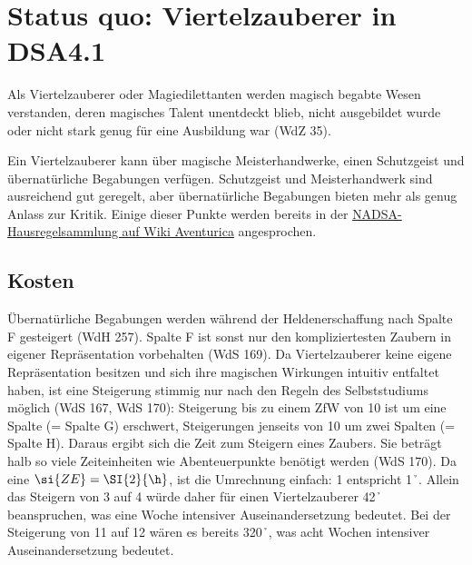 \section{Status quo: Viertelzauberer in DSA4.1}
Als Viertelzauberer oder Magiedilettanten werden magisch begabte Wesen verstanden, deren magisches Talent unentdeckt blieb, nicht ausgebildet wurde oder nicht stark genug für eine Ausbildung war (WdZ 35).

Ein Viertelzauberer kann über magische Meisterhandwerke, einen Schutzgeist und übernatürliche Begabungen verfügen. Schutzgeist und Meisterhandwerk sind ausreichend gut geregelt, aber übernatürliche Begabungen bieten mehr als genug Anlass zur Kritik. Einige dieser Punkte werden bereits in der \href{https://www.wiki-aventurica.de/wiki/Hausregelsammlung/NADSA/Viertelzauberer}{NADSA-Hausregelsammlung auf Wiki Aventurica} angesprochen.

\subsection{Kosten}
Übernatürliche Begabungen werden während der Heldenerschaffung nach Spalte F gesteigert (WdH 257). Spalte F ist sonst nur den kompliziertesten Zaubern in eigener Repräsentation vorbehalten (WdS 169). Da Viertelzauberer keine eigene Repräsentation besitzen und sich ihre magischen Wirkungen intuitiv entfaltet haben, ist eine Steigerung stimmig nur nach den Regeln des Selbststudiums möglich (WdS 167, WdS 170): Steigerung bis zu einem ZfW von 10 ist um eine Spalte (= Spalte G) erschwert, Steigerungen jenseits von 10 um zwei Spalten (= Spalte H). Daraus ergibt sich die Zeit zum Steigern eines Zaubers. Sie beträgt halb so viele Zeiteinheiten wie Abenteuerpunkte benötigt werden (WdS 170). Da eine $\si{ZE} = \SI{2}{\h}$, ist die Umrechnung einfach: \SI{1}{\AP} entspricht \SI{1}{\h}. Allein das Steigern von 3 auf 4 würde daher für einen Viertelzauberer \SI{42}{\h} beanspruchen, was eine Woche intensiver Auseinandersetzung bedeutet. Bei der Steigerung von 11 auf 12 wären es bereits \SI{320}{\h}, was acht Wochen intensiver Auseinandersetzung bedeutet.

